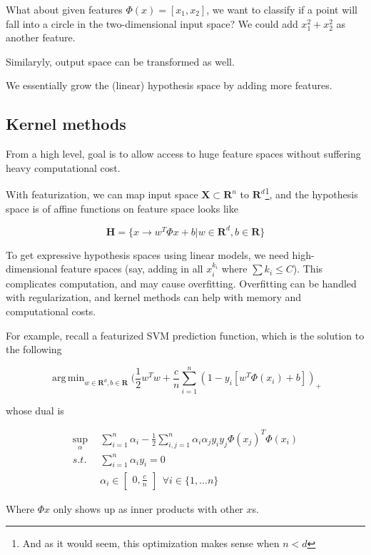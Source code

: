 \documentclass{article}
\DeclareMathOperator*{\argmin}{arg\,min}
\DeclareMathOperator*{\msup}{sup}
\begin{document}
What about given features $\Phi(x) = [x_1, x_2]$, we want to classify if a point will fall into a circle in the two-dimensional input space? We could add $x_1^2 + x_2^2$ as another feature.

Similaryly, output space can be transformed as well.

We essentially grow the (linear) hypothesis space by adding more features.

\subsection{Kernel methods}

From a high level, goal is to allow access to huge feature spaces without suffering heavy computational cost.

With featurization, we can map input space $\mathbf{X} \subset \mathbf{R}^n$ to $\mathbf{R}^d$\footnote{And as it would seem, this optimization makes sense when $n < d$}, and the hypothesis space is of affine functions on feature space looks like

$$
\mathbf{H} = \{ x \to w^{T}\Phi{x} + b | w \in \mathbf{R}^d, b \in \mathbf{R} \}
$$

To get expressive hypothesis spaces using linear models, we need high-dimensional feature spaces (say, adding in all $x_i^{k_i}$ where $\sum{k_i} \leq C$).
This complicates computation, and may cause overfitting.
Overfitting can be handled with regularization, and kernel methods can help with memory and computational costs.

For example, recall a featurized SVM prediction function, which is the solution to the following

$$
\argmin_{w \in \mathbf{R}^d, b \in \mathbf{R}} (\frac{1}{2} w^{T} w + \frac{c}{n} \sum_{i = 1}^{n}{(1 - y_i [w^T \Phi(x_i) + b])_+}
$$

whose dual is

\begin{align*}
\msup_{\alpha} ~ ~ & \sum_{i = 1}^{n}{\alpha_i} - \frac{1}{2} \sum_{i,j = 1}^{n}{\alpha_i \alpha_j y_i y_j \Phi(x_j)^{T} \Phi(x_i)} \\
s.t.               & \sum_{i = 1}^{n}{\alpha_i y_i} = 0 \\
                   & \alpha_i \in \begin{bmatrix}0, \frac{c}{n}\end{bmatrix} ~ ~ \forall i \in \{1, \dots n\}
\end{align*}

Where $\Phi{x}$ only shows up as inner products with other $x$s.
\end{document}
